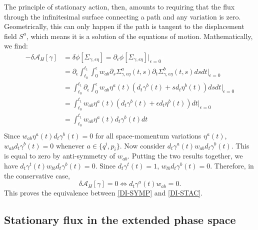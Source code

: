 \documentclass[12pt]{article}
\begin{document}
The principle of stationary action, then, amounts to requiring that the flux through the infinitesimal surface connecting a path and any variation is zero. Geometrically, this can only happen if the path is tangent to the displacement field $S^a$, which means it is a solution of the equations of motion. Mathematically, we find:
\begin{equation}\label{variationOnFlux}
	\begin{aligned}
		- \delta \mathcal{A}_H[\gamma] &=
		\delta\phi[\Sigma_{\gamma,\epsilon\eta}]= \partial_\epsilon \phi[\Sigma_{\gamma,\epsilon\eta}]|_{\epsilon=0} \\
		&= \partial_{\epsilon} \int_{t_0}^{t_1} \int_0^{\epsilon} w_{ab} \partial_s \Sigma^a_{\gamma, \epsilon \eta}(t,s) \partial_t \Sigma^b_{\gamma, \epsilon \eta}(t,s) ds dt |_{\epsilon=0} \\
		&= \int_{t_0}^{t_1} \partial_{\epsilon} \int_0^{\epsilon} w_{ab} \eta^a(t) (d_t \gamma^b(t) + s d_t \eta^b(t) ) ds dt |_{\epsilon=0} \\
		&= \int_{t_0}^{t_1} w_{ab} \eta^a(t) (d_t \gamma^b(t) + \epsilon d_t \eta^b(t)) dt |_{\epsilon=0} \\
		&= \int_{t_0}^{t_1} w_{ab} \eta^a(t) d_t \gamma^b(t) dt \\
	\end{aligned}
\end{equation}
Since $w_{ab} \eta^a(t) d_t \gamma^b(t) = 0$ for all space-momentum variations $\eta^a(t)$, $w_{ab} d_t \gamma^b(t) = 0$ whenever $a \in \{q^i, p_i\}$. Now consider $d_t \gamma^a(t) w_{ab} d_t \gamma^b(t)$. This is equal to zero by anti-symmetry of $w_{ab}$. Putting the two results together, we have $d_t \gamma^t(t) w_{tb} d_t \gamma^b(t) = 0$. Since $d_t \gamma^t(t) = 1$, $w_{tb} d_t \gamma^b(t) = 0$. Therefore, in the conservative case, 
\begin{equation}
	\delta \mathcal{A}_H[\gamma] = 0 \iff d_t \gamma^a(t) w_{ab} = 0.
\end{equation}
This proves the equivalence between \ref{DI-SYMP} and \ref{DI-STAC}.

\subsection{Stationary flux in the extended phase space}
\end{document}
